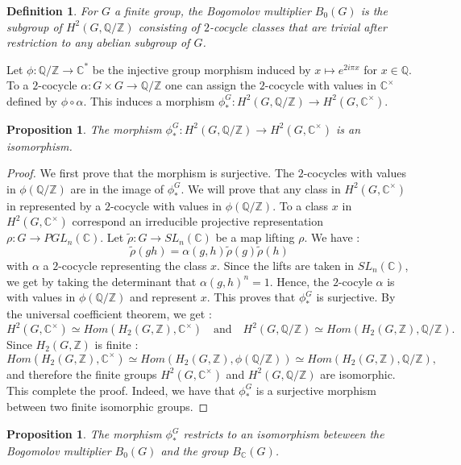 \documentclass[12pt, reqno]{amsart}
\newtheorem{proposition}[theorem]{Proposition}
\newtheorem{definition}[theorem]{Definition}
\newcommand{\C}{ {\mathbb C} }
\begin{document}
\begin{definition}
For $G$ a finite group, the Bogomolov multiplier $B_0(G)$ is the subgroup of $H^2(G,\mathbb{Q}/\mathbb{Z})$ consisting of $2$-cocycle classes that are trivial after restriction to any abelian subgroup of $G$. 
\end{definition}
Let $\phi : \mathbb{Q}/\mathbb{Z}\to \mathbb{C}^*$ be the injective group morphism induced by $x\mapsto e^{2i\pi x}$ for $x\in \mathbb{Q}$. To a $2$-cocycle $\alpha : G \times G \to \mathbb{Q}/\mathbb{Z}$ one can assign the $2$-cocycle with values in $\mathbb{C}^\times$ defined by $\phi \circ \alpha$. This induces a morphism $\phi_*^G : H^2(G, \mathbb{Q}/\mathbb{Z})\to H^2(G,\mathbb{C}^\times)$. 
\begin{proposition}
The morphism $\phi_*^G : H^2(G, \mathbb{Q}/\mathbb{Z})\to H^2(G,\mathbb{C}^\times)$ is an isomorphism.
\end{proposition}
\begin{proof}
We first prove that the morphism is surjective. The $2$-cocycles with values in $\phi(\mathbb{Q}/\mathbb{Z})$ are in the image of $\phi_*^G$. We will prove that any class in $H^2(G,\mathbb{C}^\times)$ in represented by a $2$-cocycle with values in $\phi(\mathbb{Q}/\mathbb{Z})$. To a class $x$ in $H^2(G,\mathbb{C}^\times)$ correspond an irreducible projective representation $\rho : G \to PGL_n(\mathbb{C})$. Let $\tilde{\rho}:G\to SL_n(\mathbb{C})$ be a map lifting $\rho$. We have :
$$\tilde{\rho}(gh)=\alpha(g,h)\tilde{\rho}(g)\tilde{\rho}(h)$$
with $\alpha$ a $2$-cocycle representing the class $x$. Since the lifts are taken in $SL_n(\mathbb{C})$, we get by taking the determinant that $\alpha(g,h)^n=1$. Hence, the $2$-cocyle $\alpha $ is with values in $\phi(\mathbb{Q}/\mathbb{Z})$ and represent $x$. This proves that $\phi_*^G$ is surjective. By the universal coefficient theorem, we get : 
$$ H^2(G,\mathbb{C}^\times)\simeq Hom(H_2(G,\mathbb{Z}),\mathbb{C}^\times)\quad \text{and} \quad  H^2(G, \mathbb{Q}/\mathbb{Z})\simeq Hom(H_2(G,\mathbb{Z}),\mathbb{Q}/\mathbb{Z}).$$
Since $H_2(G,\mathbb{Z})$ is finite : $$Hom(H_2(G,\mathbb{Z}),\mathbb{C}^\times)\simeq Hom(H_2(G,\mathbb{Z}), \phi(\mathbb{Q}/\mathbb{Z}))\simeq Hom(H_2(G,\mathbb{Z}),\mathbb{Q}/\mathbb{Z}),$$
and therefore the finite groups $H^2(G,\C^\times)$ and $H^2(G,\mathbb{Q}/\mathbb{Z})$ are isomorphic. This complete the proof. Indeed, we have that $\phi_*^G$ is a surjective morphism between two finite isomorphic groups.
\end{proof}
\begin{proposition}
The morphism $\phi_*^G$ restricts to an isomorphism beteween the Bogomolov multiplier $B_0(G)$ and the group $B_\mathbb{C}(G)$.
\end{proposition}
\end{document}
